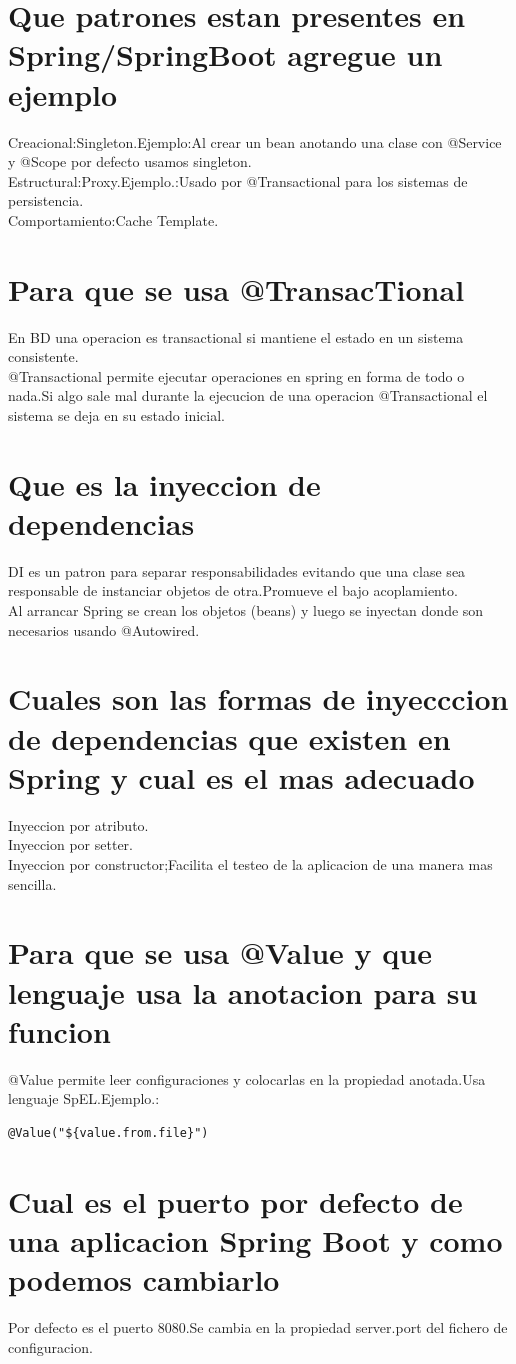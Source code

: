 \section{Que patrones estan presentes en Spring/SpringBoot agregue un ejemplo}
Creacional:Singleton.Ejemplo:Al crear un bean anotando una clase con @Service y @Scope por defecto usamos singleton.\\
Estructural:Proxy.Ejemplo.:Usado por @Transactional para los sistemas de persistencia.\\
Comportamiento:Cache Template. 
\section{Para que se usa @TransacTional}
En BD una operacion es transactional si mantiene el estado en un sistema consistente.\\
@Transactional permite ejecutar operaciones en spring en forma de todo o nada.Si algo sale mal durante la ejecucion de una operacion @Transactional el sistema se deja en su estado inicial.
\section{Que es la inyeccion de dependencias}
DI es un patron para separar responsabilidades evitando que una clase sea responsable de instanciar objetos de otra.Promueve el bajo acoplamiento.\\
Al arrancar Spring se crean los objetos (beans) y luego se inyectan donde son necesarios usando @Autowired.
\section{Cuales son las formas de inyecccion de dependencias que existen en Spring y cual es el mas adecuado}
Inyeccion por atributo.\\
Inyeccion por setter.\\
Inyeccion por constructor;Facilita el testeo de la aplicacion de una manera mas sencilla.
\section{Para que se usa @Value y que lenguaje usa la anotacion para su funcion}
@Value permite leer configuraciones y colocarlas en la propiedad anotada.Usa lenguaje SpEL.Ejemplo.:
\begin{lstlisting}
@Value("${value.from.file}")
\end{lstlisting}
\section{Cual es el puerto por defecto de una aplicacion Spring Boot y como podemos cambiarlo}
Por defecto es el puerto 8080.Se cambia en la propiedad server.port del fichero de configuracion.
